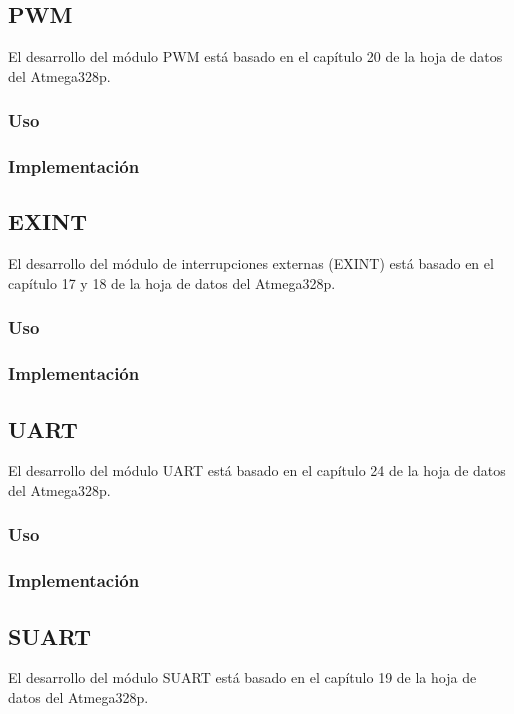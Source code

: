 \subsection{PWM}
El desarrollo del módulo PWM está basado en el capítulo 20 de la hoja de datos del Atmega328p.

\subsubsection{Uso}

\subsubsection{Implementación}

\subsection{EXINT}
El desarrollo del módulo de interrupciones externas (EXINT) está basado en el capítulo 17 y 18 de la hoja de datos del Atmega328p.

\subsubsection{Uso}

\subsubsection{Implementación}

\subsection{UART}
El desarrollo del módulo UART está basado en el capítulo 24 de la hoja de datos del Atmega328p.

\subsubsection{Uso}

\subsubsection{Implementación}

\subsection{SUART}
El desarrollo del módulo SUART está basado en el capítulo 19 de la hoja de datos del Atmega328p.

